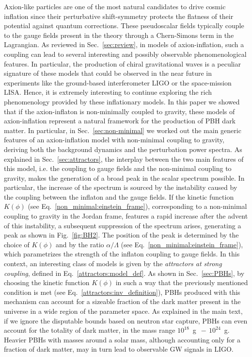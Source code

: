 Axion-like particles are one of the most natural candidates to drive cosmic inflation since their perturbative shift-symmetry protects the flatness of their potential against quantum corrections. These pseudoscalar fields typically couple to the gauge fields present in the theory through a Chern-Simons term in the Lagrangian. As reviewed in Sec.~\ref{sec:review}, in models of axion-inflation, such a coupling can lead to several interesting and possibly observable phenomenological features. In particular, the production of chiral gravitational waves is a peculiar signature of these models that could be observed in the near future in experiments like the ground-based interferometer LIGO or the space-mission LISA. Hence, it is extremely interesting to continue exploring the rich phenomenology provided by these inflationary models. In this paper we showed that if the axion-inflaton is non-minimally coupled to gravity, these models of axion-inflation represent a natural framework for the production of PBH dark matter. In particular, in Sec.~\ref{sec:non-minimal} we worked out the main generic features of an axion-inflation model with non-minimal coupling to gravity, deriving both the background dynamics and the perturbation power spectra. As explained in Sec.~\ref{sec:attractors}, the interplay between the two main features of this model, i.e. the coupling to gauge fields and the non-minimal coupling to gravity, makes the generation of a broad peak in the scalar spectrum possible. In particular, the increase of the spectrum is sourced by the instability caused by the coupling between the inflaton and the gauge fields. If the kinetic function $K(\phi)$ (see Eq.~\ref{non_minimal:einstein_frame}), corresponding to a non-minimal coupling to gravity in the Jordan frame, features a rapid increase after the advent of this instability, a subsequent suppression of the spectrum arises, generating a peak as shown in Fig.~\ref{fig:BH2}. The position of the peak is determined by the choice of $K(\phi)$ and by the ratio $\alpha/\Lambda$ (see Eq.~\ref{non_minimal:einstein_frame}), which parametrizes the strength of the inflaton coupling to gauge fields. In this context, an interesting class of models is given by the \textit{attractors at strong coupling}, defined in Eq.~\eqref{attractors:model_def}. As shown in Sec.~\ref{sec:PBHs}, by choosing the kinetic function $K(\phi)$ in such a way that the previously mentioned condition is met (see Eq.~\eqref{attractors:inv_definition}), PBHs produced with this mechanism can account for a sizeable fraction of the dark matter present in the universe in a wide region of the parameter space. As explained in the main text, if we ignore the disputable bounds based on neutron star capture, PBHs can even account for the totality of dark matter, in the mass range $10^{18}$~g $\, - \, 10^{24}$~g. Heavier PBHs with masses around a solar mass, although accounting only for a fraction of dark matter, may in turn lead to observable GW signals in LIGO.

